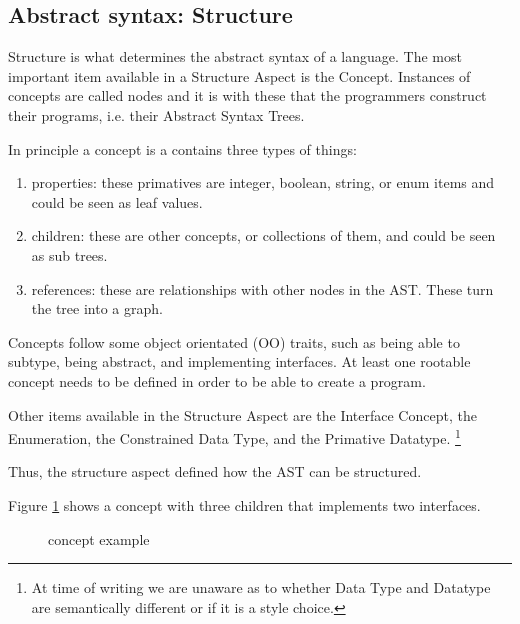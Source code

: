 \subsection{Abstract syntax: Structure}
Structure is what determines the abstract syntax of a language.
The most important item available in a Structure Aspect is the Concept.
Instances of concepts are called nodes and it is with these that the programmers construct their programs, i.e. their Abstract Syntax Trees.

In principle a concept is a contains three types of things:
\begin{enumerate}
    \item properties: these primatives are integer, boolean, string, or enum items and could be seen as leaf values.
    \item children: these are other concepts, or collections of them, and could be seen as sub trees.
    \item references: these are relationships with other nodes in the AST. These turn the tree into a graph.
\end{enumerate}

Concepts follow some object orientated (OO) traits, such as being able to subtype, being abstract, and implementing interfaces.
At least one rootable concept needs to be defined in order to be able to create a program.

Other items available in the Structure Aspect are the Interface Concept, the Enumeration, the Constrained Data Type, and the Primative Datatype. 
\footnote{At time of writing we are unaware as to whether Data Type and Datatype are semantically different or if it is a style choice.}

Thus, the structure aspect defined how the AST can be structured.

Figure \ref{fig:concept_example} shows a concept with three children that implements two interfaces.

\begin{figure}[h]
    \centering
    \caption{concept example}
    \label{fig:concept_example}
\end{figure}
 


